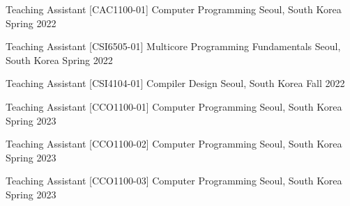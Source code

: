 

\begin{cventries}

  \cventry
    {Teaching Assistant} %
    {[CAC1100-01] Computer Programming} %
    {Seoul, South Korea} %
    {Spring 2022} %
    {}

  \cventry
    {Teaching Assistant} %
    {[CSI6505-01] Multicore Programming Fundamentals} %
    {Seoul, South Korea} %
    {Spring 2022} %
    {}

    \cventry
    {Teaching Assistant} %
    {[CSI4104-01] Compiler Design} %
    {Seoul, South Korea} %
    {Fall 2022} %
    {}

    \cventry
    {Teaching Assistant} %
    {[CCO1100-01] Computer Programming} %
    {Seoul, South Korea} %
    {Spring 2023} %
    {}

    \cventry
    {Teaching Assistant} %
    {[CCO1100-02] Computer Programming} %
    {Seoul, South Korea} %
    {Spring 2023} %
    {}

    \cventry
    {Teaching Assistant} %
    {[CCO1100-03] Computer Programming} %
    {Seoul, South Korea} %
    {Spring 2023} %
    {}
\end{cventries}
